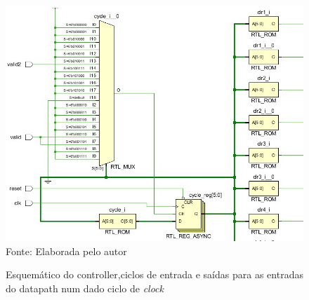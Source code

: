 \begin{figure}[H]
	\centering
	\caption{Esquemático do controller,ciclos de entrada e saídas para as  entradas do datapath num dado  ciclo de \textit{clock}}
	\includegraphics[width=15cm]{figures/controller.jpg}\\
	{Fonte: Elaborada pelo autor}	
	\label{esquema}
\end{figure}

